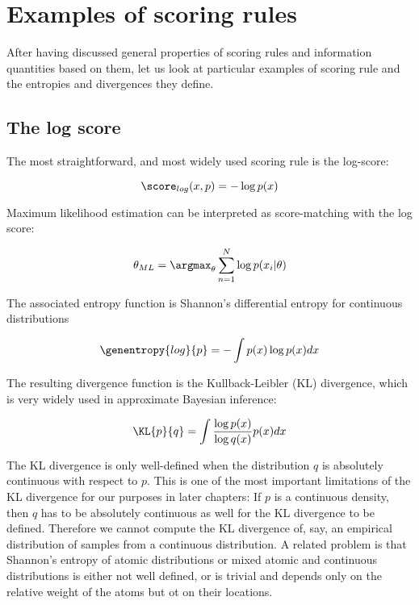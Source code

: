 \section{Examples of scoring rules}

After having discussed general properties of scoring rules and information quantities based on them, let us look at particular examples of scoring rule and the entropies and divergences they define.

\subsection{The log score}

The most straightforward, and most widely used scoring rule is the log-score:

\begin{equation}
	\score_{log}(x,p) = - \log p(x) 
\end{equation}

Maximum likelihood estimation can be interpreted as score-matching with the log score:

\begin{equation}
	\theta_{ML} = \argmax_{\theta} \sum_{n=1}^{N} \log p(x_i \vert \theta)
\end{equation}

The associated entropy function is Shannon's differential entropy for continuous distributions

\begin{equation}
	\genentropy{log}{p} = - \int p(x) \log p(x) dx
\end{equation}

The resulting divergence function is the Kullback-Leibler (KL) divergence, which is very widely used in approximate Bayesian inference:

\begin{equation}
	\KL{p}{q} = \int \frac{\log p(x)}{\log q(x)} p(x) dx
\end{equation}

The KL divergence is only well-defined when the distribution $q$ is absolutely continuous with respect to $p$. This is one of the most important limitations of the KL divergence for our purposes in later chapters: If $p$ is a continuous density, then $q$ has to be absolutely continuous as well for the KL divergence to be defined. Therefore we cannot compute the KL divergence of, say, an empirical distribution of samples from a continuous distribution. A related problem is that Shannon's entropy of atomic distributions or mixed atomic and continuous distributions is either not well defined, or is trivial and depends only on the relative weight of the atoms but ot on their locations.

